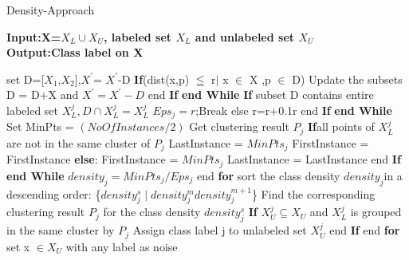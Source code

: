 \documentclass[10pt, conference, compsocconf]{IEEEtran}
\begin{document}
\begin{algorithm}
\caption{Density-Approach}
\hspace*{\algorithmicindent} \textbf{\small Input:X=$X_{L} \cup X_{U}$, labeled set $X_{L}$ and unlabeled set $X_{U}$} \\
\hspace*{\algorithmicindent} \textbf{Output:Class label on X}
\begin{algorithmic}[1]
\While{}
\State set D=[$X_{1}$,$X_{2}$],$X^{'}$= $X^{'}$-D
\State \textbf{If}(dist(x,p) $\leqq$ r$\mid$ x $\in$ X ,p $\in$ D) 
\State Update the subsets D = D+X and $X^{'}=X^{'}-D$
\State end \textbf{If}
\EndWhile
\State \textbf{end While}
\State \textbf{If} {\footnotesize subset D contains entire labeled set $X^{j}_L, D \cap X^{j}_L = X^{j}_L$}
\State $Eps_{j}=r$;Break
\State else r=r+0.1r
\State end \textbf{If}
\EndWhile
\State \textbf{end While}
\State Set MinPts = $(NoOfInstances/2)$
\While{}
\State Get clustering result $P_{j}$
\State \textbf{If}{\small all points of $X^{j}_L$ are not in the same cluster of $P_{j}$}
\State LastInstance = $MinPts_{j}$
\State FirstInstance = FirstInstance
\State \textbf{else}:
\State FirstInstance = $MinPts_{j}$              
\State LastInstance = LastInstance
\State end \textbf{If}
\EndWhile
\State \textbf{end While}
\State $density_{j}=MinPts_{j}/Eps_{j}$
\EndFor
\State end \textbf{for}
\State sort the class density {$density_{j}$}in a descending order:
\State \{$density^{s}_j \mid density^{m}_j  density^{m+1}_j $\}
\State Find the corresponding clustering result $P_{j}$ for the class density $density^{s}_j$
\State \textbf{If} {\small $X^{j}_U \subseteq X_U$ and $X^{j}_L$ is grouped in the same cluster by $P_{j}$}
\State Assign class label j to unlabeled set $X^{j}_U$
\State end \textbf{If}
\EndFor
\State end \textbf{for}
\State set x $\in X_U$ with any label as noise
\end{algorithmic}
\end{algorithm}
\end{document}
